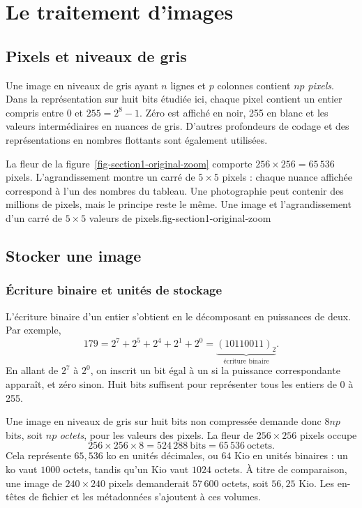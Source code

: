 \chapter{Le traitement d'images}
\label{chap-images}

\section{Pixels et niveaux de gris}
Une image en niveaux de gris ayant $n$ lignes et $p$ colonnes contient $np$ \emph{pixels}. Dans la représentation sur huit bits étudiée ici, chaque pixel contient un entier compris entre $0$ et $255=2^8-1$. Zéro est affiché en noir, 255 en blanc et les valeurs intermédiaires en nuances de gris. D'autres profondeurs de codage et des représentations en nombres flottants sont également utilisées.

La fleur de la figure~\ref{fig-section1-original-zoom} comporte $256\times256=65\,536$ pixels. L'agrandissement montre un carré de $5\times5$ pixels : chaque nuance affichée correspond à l'un des nombres du tableau. Une photographie peut contenir des millions de pixels, mais le principe reste le même.
{Une image et l'agrandissement d'un carré de $5\times5$ valeurs de pixels.}{fig-section1-original-zoom}

\section{Stocker une image}
\subsection{Écriture binaire et unités de stockage}
L'écriture binaire d'un entier s'obtient en le décomposant en puissances de deux. Par exemple,
\[
 179=2^7+2^5+2^4+2^1+2^0
    =\underbrace{(10110011)_2}_{\text{écriture binaire}}.
\]
En allant de $2^7$ à $2^0$, on inscrit un bit égal à un si la puissance correspondante apparaît, et zéro sinon. Huit bits suffisent pour représenter tous les entiers de 0 à 255.

Une image en niveaux de gris sur huit bits non compressée demande donc $8np$ bits, soit $np$ \emph{octets}, pour les valeurs des pixels. La fleur de $256\times256$ pixels occupe
\[
 256\times256\times8=524\,288\ \text{bits}
       =65\,536\ \text{octets}.
\]
Cela représente $65{,}536$ ko en unités décimales, ou $64$ Kio en unités binaires : un ko vaut $1000$ octets, tandis qu'un Kio vaut $1024$ octets. À titre de comparaison, une image de $240\times240$ pixels demanderait $57\,600$ octets, soit $56{,}25$ Kio. Les en-têtes de fichier et les métadonnées s'ajoutent à ces volumes.

